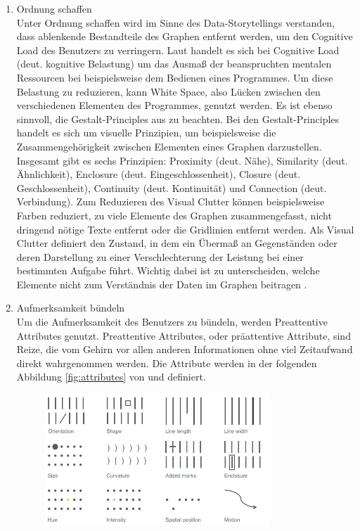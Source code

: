 \begin{enumerate}
\begin{multicols}{2}
    \end{multicols}
    Unter \cite{SeverinoRibecca.} werden viele Charttypen aufgelistet, die vereinfacht dargestellt sind und auch nach Funktion gefiltert werden können. Das kann bei der Auswahl des passenden Charttyps helfen.\\
    \item Ordnung schaffen\hfill\\ Unter Ordnung schaffen wird im Sinne des Data-Storytellings verstanden, dass ablenkende Bestandteile des Graphen entfernt werden, um den \glqq Cognitive Load\grqq{} des Benutzers zu verringern. Laut \cite{Plass.2010} handelt es sich bei Cognitive Load (deut. kognitive Belastung) um das Ausmaß der beanspruchten mentalen Ressourcen bei beispielsweise dem Bedienen eines Programmes. Um diese Belastung zu reduzieren, kann White Space, also Lücken zwischen den verschiedenen Elementen des Programmes, genutzt werden. Es ist ebenso sinnvoll, die Gestalt-Principles aus \cite{Schwabish.2021} zu beachten. Bei den Gestalt-Principles handelt es sich um visuelle Prinzipien, um beispielsweise die  Zusammengehörigkeit zwischen Elementen eines Graphen darzustellen. Insgesamt gibt es sechs Prinzipien: Proximity (deut. Nähe), Similarity (deut. Ähnlichkeit), Enclosure (deut. Eingeschlossenheit), Closure (deut. Geschlossenheit), Continuity (deut. Kontinuität) und Connection (deut. Verbindung). Zum Reduzieren des Visual Clutter können beispielsweise Farben reduziert, zu viele Elemente des Graphen zusammengefasst, nicht dringend nötige Texte entfernt oder die Gridlinien entfernt werden. Als Visual Clutter definiert \cite{Rosenholtz.2005} den Zustand, in dem ein Übermaß an Gegenständen oder deren Darstellung zu einer Verschlechterung der Leistung bei einer bestimmten Aufgabe führt. Wichtig dabei ist zu unterscheiden, welche Elemente nicht zum Verständnis der Daten im Graphen beitragen \cite{TalksatGoogle.2015}.\\
    \item Aufmerksamkeit bündeln\hfill\\ Um die Aufmerksamkeit des Benutzers zu bündeln, werden \glqq Preattentive Attributes\grqq{} genutzt. Preattentive Attributes, oder präattentive Attribute, sind Reize, die vom Gehirn vor allen anderen Informationen ohne viel Zeitaufwand direkt wahrgenommen werden. Die Attribute werden in der folgenden Abbildung \ref{fig:attributes} von \cite{Knaflic.2016} und \cite{Few.2004} definiert.
    \begin{figure}[h!]
    \centering
    \includegraphics[width=0.8\textwidth]{gfx/preattentive attributes.png}

\end{figure}
\end{enumerate}
